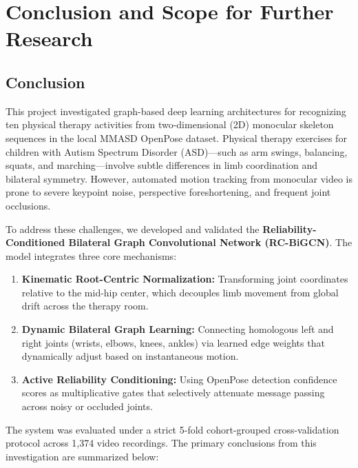 \chapter{Conclusion and Scope for Further Research}
\label{chap.5}

\section{Conclusion}

This project investigated graph-based deep learning architectures for recognizing ten physical therapy activities from two-dimensional (2D) monocular skeleton sequences in the local MMASD OpenPose dataset. Physical therapy exercises for children with Autism Spectrum Disorder (ASD)—such as arm swings, balancing, squats, and marching—involve subtle differences in limb coordination and bilateral symmetry. However, automated motion tracking from monocular video is prone to severe keypoint noise, perspective foreshortening, and frequent joint occlusions.

To address these challenges, we developed and validated the \textbf{Reliability-Conditioned Bilateral Graph Convolutional Network (RC-BiGCN)}. The model integrates three core mechanisms:
\begin{enumerate}
    \item \textbf{Kinematic Root-Centric Normalization:} Transforming joint coordinates relative to the mid-hip center, which decouples limb movement from global drift across the therapy room.
    \item \textbf{Dynamic Bilateral Graph Learning:} Connecting homologous left and right joints (wrists, elbows, knees, ankles) via learned edge weights that dynamically adjust based on instantaneous motion.
    \item \textbf{Active Reliability Conditioning:} Using OpenPose detection confidence scores as multiplicative gates that selectively attenuate message passing across noisy or occluded joints.
\end{enumerate}

The system was evaluated under a strict 5-fold cohort-grouped cross-validation protocol across 1,374 video recordings. The primary conclusions from this investigation are summarized below:

